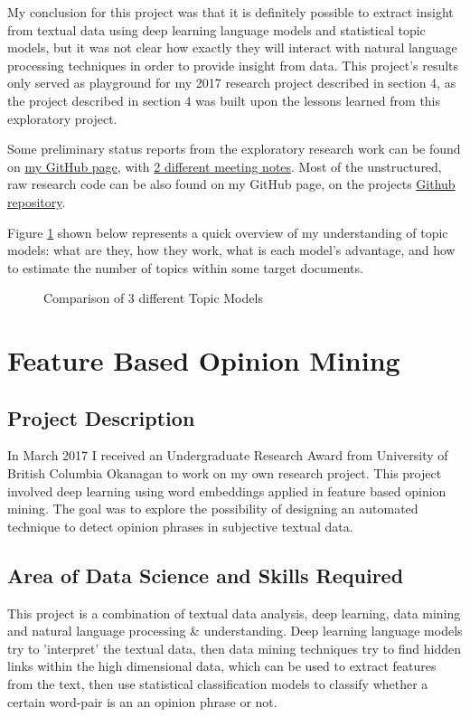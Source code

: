 \documentclass[12pt]{article} %
\begin{document}
My conclusion for this project was that it is definitely possible to extract insight from textual data using deep learning language models and statistical topic models, but it was not clear how exactly they will interact with natural language processing techniques in order to provide insight from data. This project's results only served as playground for my 2017 research project described in section 4, as the project described in section 4 was built upon the lessons learned from this exploratory project.

Some preliminary status reports from the exploratory research work can be found on \href{https://github.com/norberte/DeepNLP-TopicModelling/blob/master/Meeting\%20slides.pdf}{my GitHub page}, with \href{https://github.com/norberte/DeepNLP-TopicModelling/blob/master/Status\%20report\%20(2).pdf}{2 different meeting notes}.
Most of the unstructured, raw research code can be also found on my GitHub page, on the projects \href{https://github.com/norberte/DeepNLP-TopicModelling}{Github repository}\cite{GitHubDeepNLP}.

Figure \ref{fig:topicModels} shown below represents a quick overview of my understanding of topic models: what are they, how they work, what is each model's advantage, and how to estimate the number of topics within some target documents.

\begin{figure}[H]
\caption{Comparison of 3 different Topic Models}
\label{fig:topicModels}
\end{figure}

\section{Feature Based Opinion Mining} %
\subsection{Project Description} %
In March 2017 I received an Undergraduate Research Award from University of British Columbia Okanagan to work on my own research project. This project involved deep learning using word embeddings applied in feature based opinion mining. The goal was to explore the possibility of designing an automated technique to detect opinion phrases in subjective textual data.

\subsection{Area of Data Science and Skills Required} %
This project is a combination of textual data analysis, deep learning, data mining and natural language processing \& understanding. Deep learning language models try to 'interpret' the textual data, then data mining techniques try to find hidden links within the high dimensional data, which can be used to extract features from the text, then use statistical classification models to classify whether a certain word-pair is an an opinion phrase or not.
\end{document}
